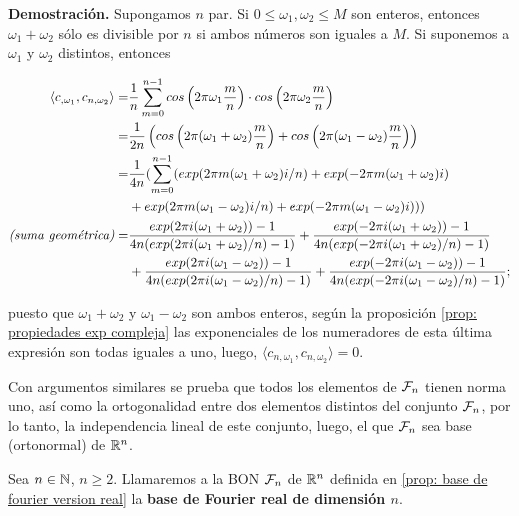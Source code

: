 \noindent
\textbf{Demostración.}
Supongamos $n$ par. Si $0 \leq \omega_{1}, \omega_{2} \leq M$
son enteros, entonces
$\omega_{1} + \omega_{2}$ sólo es divisible por $n$ si ambos números
son iguales a $M$. Si suponemos a $\omega_{1}$ y $\omega_{2}$ distintos, 
entonces

\begin{align*}
\langle c_{, \omega_{1}} , c_{n, \omega_{2}} \rangle = &
\frac{1}{n} \sum\limits_{m=0}^{n-1}cos \left(2 \pi \omega_{1} \frac{m}{n} \right) \cdot 
cos \left(2 \pi \omega_{2} \frac{m}{n} \right) \\
= &\frac{1}{2n} \left(
cos \left(2 \pi (\omega_{1} + \omega_{2}) \frac{m}{n} \right) +
cos \left(2 \pi (\omega_{1} - \omega_{2}) \frac{m}{n} \right)
\right) \\
= & \frac{1}{4n} (
\sum\limits_{m=0}^{n-1}
(exp(2 \pi m(\omega_{1}+\omega_{2})i/n) +
exp(-2 \pi m(\omega_{1}+\omega_{2})i) \\
&  + exp(2 \pi m(\omega_{1}-\omega_{2})i/n) +
exp(-2 \pi m(\omega_{1}-\omega_{2})i)) )\\
\textit{(suma geométrica)} = & 
\frac{exp(2 \pi i (\omega_{1}+\omega_{2}))-1}{4n (exp(2 \pi i (\omega_{1}+\omega_{2})/n)-1)} +
\frac{exp(- 2 \pi i (\omega_{1}+\omega_{2}))-1}{4n (exp(-2 \pi i (\omega_{1}+\omega_{2})/n)-1)}
\\
& + 
\frac{exp(2 \pi i (\omega_{1}-\omega_{2}))-1}{4n (exp(2 \pi i (\omega_{1}-\omega_{2})/n)-1)} +
\frac{exp(- 2 \pi i (\omega_{1}-\omega_{2}))-1}{4n (exp(-2 \pi i (\omega_{1}-\omega_{2})/n)-1)};
\\
\end{align*}

\noindent
puesto que $\omega_{1}+\omega_{2}$ y $\omega_{1}-\omega_{2}$
son ambos enteros, según la proposición 
\ref{prop: propiedades exp compleja} las exponenciales de los numeradores
de esta última expresión son todas iguales a uno, luego, 
$\langle c_{n, \omega_{1}} , c_{n, \omega_{2}} \rangle  =0$. 


Con argumentos similares se prueba 
que todos los elementos de $\mathcal{F}_{n}$ tienen norma uno, así como
la ortogonalidad entre dos elementos
distintos del conjunto $\mathcal{F}_{n}$, por lo tanto, la independencia lineal de
este conjunto, luego, el que $\mathcal{F}_{n}$ sea base 
(ortonormal) de $\mathbb{R}^{n}$.


\QEDB
\vspace{0.2cm}



\begin{defi}
Sea $n \in \mathbb{N}$, $n \geq 2$. Llamaremos a la BON
$\mathcal{F}_{n}$ de $\mathbb{R}^{n}$ definida en \ref{prop: base de fourier version real}
la \textbf{base de Fourier real de dimensión $n$}.
\end{defi}

